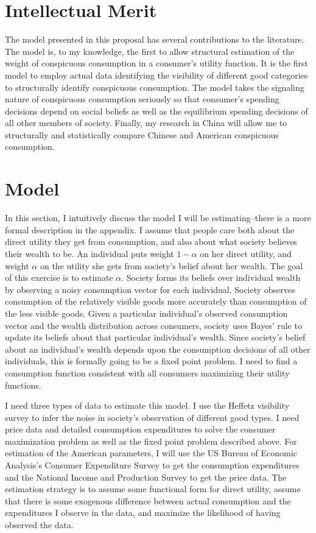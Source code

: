 \documentclass[a4paper,10pt]{article}
\begin{document}
\section{Intellectual Merit}
The model presented in this proposal has several contributions to the literature.  The model is, to my knowledge, the first to allow structural estimation of the weight of conspicuous consumption in a consumer's utility function.  It is the first model to employ actual data identifying the visibility of different good categories to structurally identify conspicuous consumption.  The model takes the signaling nature of conspicuous consumption seriously so that consumer's spending decisions depend on social beliefs as well as the equilibrium spending decisions of all other members of society.  Finally, my research in China will allow me to structurally and statistically compare Chinese and American conspicuous consumption.        

\section{Model}
In this section, I intuitively discuss the model I will be estimating--there is a more formal description in the appendix.  I assume that people care both about the direct utility they get from consumption, and also about what society believes their wealth to be.  An individual puts weight $1-\alpha$ on her direct utility, and weight $\alpha$ on the utility she gets from society's belief about her wealth.  The goal of this exercise is to estimate $\alpha$.  Society forms its beliefs over individual wealth by observing a noisy consumption vector for each individual.  Society observes consumption of the relatively visible goods more accurately than consumption of the less visible goods.  Given a particular individual's observed consumption vector and the wealth distribution across consumers, society uses Bayes' rule to update its beliefs about that particular individual's wealth.  Since society's belief about an individual's wealth depends upon the consumption decisions of all other individuals, this is formally going to be a fixed point problem.  I need to find a consumption function consistent with all consumers maximizing their utility functions. 

I need three types of data to estimate this model.  I use the Heffetz visibility survey to infer the noise in society's observation of different good types.  I need price data and detailed consumption expenditures to solve the consumer maximization problem as well as the fixed point problem described above.  For estimation of the American parameters, I will use the US Bureau of Economic Analysis's Consumer Expenditure Survey to get the consumption expenditures and the National Income and Production Survey to get the price data.  The estimation strategy is to assume some functional form for direct utility, assume that there is some exogenous difference between actual consumption and the expenditures I observe in the data, and maximize the likelihood of having observed the data.
\end{document}
